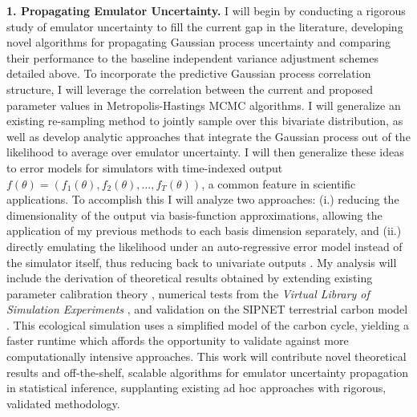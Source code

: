 \documentclass[11pt]{article}
\begin{document}
 \textbf{1. Propagating Emulator Uncertainty.} I will begin by conducting a rigorous study of emulator uncertainty to fill the current gap in the literature, developing novel algorithms for propagating Gaussian process uncertainty and comparing their performance to the baseline independent variance adjustment schemes detailed above. To incorporate the predictive Gaussian process correlation structure, I will leverage the correlation between the current and proposed parameter values in Metropolis-Hastings MCMC algorithms. I will generalize an existing re-sampling method \cite{Fer} to jointly sample over this bivariate distribution, as well as develop analytic approaches that integrate the Gaussian process out of the likelihood to average over emulator uncertainty. 
I will then generalize these ideas to error models for simulators with time-indexed output $f(\theta) = (f_1(\theta), f_2(\theta), \dots, f_T(\theta))$, a common feature in scientific applications. To accomplish this I will analyze two approaches: (i.) reducing the dimensionality of the output via basis-function 
 approximations, allowing the application of my previous methods to each basis dimension separately, and (ii.) directly emulating the likelihood under an auto-regressive error model instead of the simulator itself, thus reducing back to univariate outputs \cite{Fer}.
 My analysis will include the derivation of theoretical results obtained by extending existing parameter calibration theory \cite{Tuo}, numerical tests from the 
 \textit{Virtual Library of Simulation Experiments} \cite{Surjanovic}, and validation on the SIPNET terrestrial carbon model \cite{Fer}. This ecological simulation uses a simplified model of the carbon cycle, yielding a faster runtime which affords the opportunity to validate against more computationally intensive approaches. This work will contribute novel theoretical results and off-the-shelf, scalable algorithms for emulator uncertainty propagation in statistical inference, supplanting existing ad hoc approaches with rigorous, validated methodology. 
\end{document}
